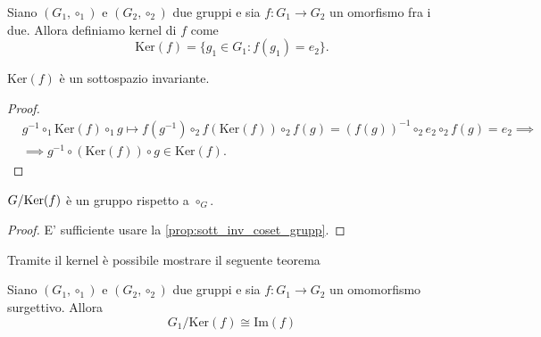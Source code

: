 \begin{definition}
	Siano $(G_1, \circ_1)$ e $(G_2, \circ_2)$ due gruppi e sia $f: G_1 \to G_2$ un omorfismo fra i due. Allora definiamo kernel di $f$ come
	\begin{equation}
		\text{Ker}(f) = \{ g_1 \in G_1 : f(g_1) = e_2 \}.
	\end{equation}
\end{definition}
\begin{prop}
	$\text{Ker}(f)$ è un sottospazio invariante.
\end{prop}
\begin{proof}
\begin{align}
	&g^{-1} \circ_1 \text{Ker}(f) \circ_1 g \mapsto f(g^{-1}) \circ_2 f(\text{Ker}(f)) \circ_2 f(g) = (f(g))^{-1} \circ_2 e_2 \circ_2 f(g) = e_2 \implies \nonumber \\
	&\implies g^{-1} \circ (\text{Ker}(f)) \circ g \in \text{Ker}(f). 
\end{align}
\end{proof}
\begin{cor} \label{cor:g_ker_grupp}
	$G/\!{\, \text{Ker}(f)}$ è un gruppo rispetto a $\circ_G$.
\end{cor}
\begin{proof}
	E' sufficiente usare la \ref{prop:sott_inv_coset_grupp}.
\end{proof}

Tramite il kernel è possibile mostrare il seguente teorema

\begin{theorem}
    Siano $(G_1, \circ_1)$ e $(G_2, \circ_2)$ due gruppi e sia $f: G_1 \to G_2$ un omomorfismo surgettivo. Allora
    \begin{equation}
        G_1 / \text{Ker}(f) \cong \text{Im}(f)
    \end{equation}
\end{theorem}

